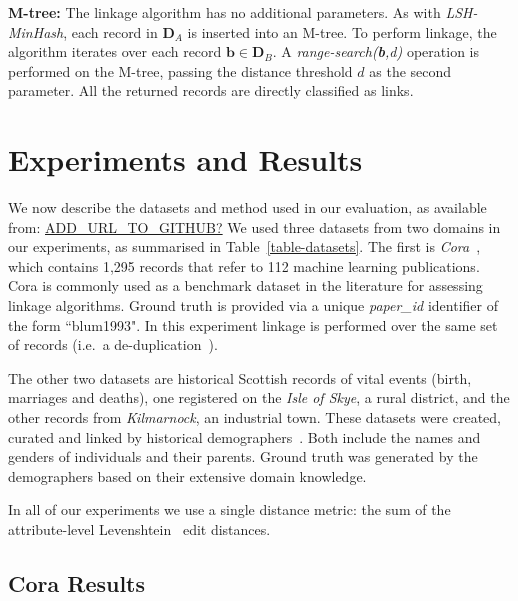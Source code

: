 \documentclass{llncs}
\begin{document}
\textbf{M-tree:} The linkage algorithm has no additional parameters. As
with \emph{LSH-MinHash}, each record in $\mathbf{D}_A$ is inserted into
an M-tree. To perform linkage, the algorithm iterates over each record
$\mathbf{b} \in \mathbf{D}_B$. A \emph{range-search(\textbf{b},d)}
operation is performed on the M-tree, passing the distance threshold $d$
as the second parameter. All the returned records are directly
classified as links.


\section{Experiments and Results}
\label{sec-exp}

We now describe the datasets and method used in our
evaluation, as available from: \url{ADD\_URL\_TO\_GITHUB?}
\label{sec-data} We used three
datasets from two domains in our experiments, as summarised in
Table~\ref{table-datasets}. The first is \emph{Cora}~\cite{Cora2017},
which contains 1,295 records that refer to 112 machine learning
publications. Cora is commonly used as a benchmark dataset in the
literature for assessing linkage algorithms. Ground truth is provided
via a unique \emph{paper\_id} identifier of the form ``blum1993". In
this experiment linkage is performed over the same set of records (i.e.\
a de-duplication~\cite{Chr12}).


The other two datasets are historical Scottish records of vital events
(birth, marriages and deaths), one registered on the \emph{Isle of
Skye}, a rural district, and the other records from \emph{Kilmarnock},
an industrial town. These datasets were created, curated and linked by
historical demographers~\cite{reid2006,reid2002}. Both include the names
and genders of individuals and their parents. Ground truth was generated
by the demographers based on their extensive domain knowledge.

In all of our experiments we use a single distance metric: the sum of
the attribute-level Levenshtein~\cite{Levenshtein66} edit distances.

\subsection{Cora Results}
\end{document}
